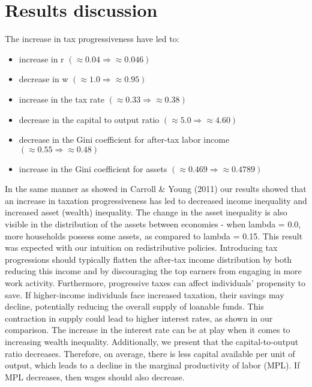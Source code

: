 \documentclass{article}
\begin{document}
\section*{Results discussion}
The increase in tax progressiveness have led to:
\begin{itemize}
    \item increase in r \((\approx 0.04 \Longrightarrow \approx 0.046)\)
    \item decrease in w \((\approx 1.0 \Longrightarrow \approx 0.95)\)
    \item increase in the tax rate \((\approx 0.33 \Longrightarrow \approx 0.38)\)
    \item decrease in the capital to output ratio \((\approx 5.0 \Longrightarrow \approx 4.60)\)
    \item decrease in the Gini coefficient for after-tax labor income \((\approx 0.55 \Longrightarrow \approx 0.48)\)
    \item increase in the Gini coefficient for assets \((\approx 0.469 \Longrightarrow \approx 0.4789)\)
\end{itemize}
\newline
In the same manner as showed in Carroll \& Young (2011) our results showed that an increase in taxation progressiveness has led to decreased income inequality and increased asset (wealth) inequality. The change in the asset inequality is also visible in the distribution of the assets between economies - when lambda = 0.0, more households possess some assets, as compared to lambda = 0.15. 
\newline
\newline
This result was expected with our intuition on redistributive policies.  Introducing tax progressions should typically flatten the after-tax income distribution by both reducing this income and by discouraging the top earners from engaging in more work activity. Furthermore, progressive taxes can affect individuals' propensity to save. If higher-income individuals face increased taxation, their savings may decline, potentially reducing the overall supply of loanable funds. This contraction in supply could lead to higher interest rates, as shown in our comparison. The increase in the interest rate can be at play when it comes to increasing wealth inequality. Additionally, we present that the capital-to-output ratio decreases. Therefore, on average, there is less capital available per unit of output, which leads to a decline in the marginal productivity of labor (MPL). If MPL decreases, then wages should also decrease. 
\end{document}
